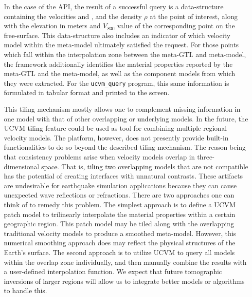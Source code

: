 In the case of the API, the result of a successful query is a data-structure containing the velocities \vp{} and \vs{}, and the density $\rho$ at the point of interest, along with the elevation in meters and $V_{S30}$ value of the corresponding point on the free-surface. This data-structure also includes an indicator of which velocity model within the meta-model ultimately satisfied the request. For those points which fall within the interpolation zone between the meta-GTL and meta-model, the framework additionally identifies the material properties reported by the meta-GTL and the meta-model, as well as the component models from which they were extracted. For the \texttt{ucvm\_query} program, this same information is formulated in tabular format and printed to the screen.

This tiling mechanism mostly allows one to complement missing information in one model with that of other overlapping or underlying models. In the future, the UCVM tiling feature could be used as tool for combining multiple regional velocity models. The platform, however, does not presently provide built-in functionalities to do so beyond the described tiling mechanism. The reason being that consistency problems arise when velocity models overlap in three-dimensional space. That is, tiling two overlapping models that are not compatible has the potential of creating interfaces with unnatural contrasts. These artifacts are undesirable for earthquake simulation applications because they can cause unexpected wave reflections or refractions. There are two approaches one can think of to remedy this problem. The simplest approach is to define a UCVM patch model to trilinearly interpolate the material properties within a certain geographic region. This patch model may be tiled along with the overlapping traditional velocity models to produce a smoothed meta-model. However, this numerical smoothing approach does may reflect the physical structures of the Earth's surface. The second approach is to utilize UCVM to query all models within the overlap zone individually, and then manually combine the results with a user-defined interpolation function. We expect that future tomographic inversions of larger regions will allow us to integrate better models or algorithms to handle this.
